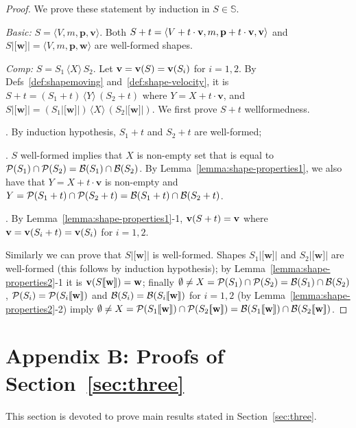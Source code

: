 \documentclass[11pt]{article}
\newcommand{\lsbrace}{\ensuremath{|\![}}
\newcommand{\rsbrace}{\ensuremath{]\!|}}
\newcommand{\shapes}{\mathbb{S}}
\newcommand{\vect}[1]{\mathbf{#1}}
\newcommand{\union}[1]{\ensuremath{\,\langle #1 \rangle\,}}
\newcommand{\bs}[4]{\ensuremath{\langle #1, #2, #3, \mathbf{#4}
\rangle}}
\newcommand{\boundary}[1]{\ensuremath{{\cal B}(#1)}}
\newcommand{\points}[1]{\ensuremath{{\cal P}(#1)}}
\newcommand{\velocity}[1]{{\bf v}(#1)}
\begin{document}
\begin{proof}
We prove these statement by induction in $S \in \shapes$.
\par\medskip\noindent
{\em Basic:} $S = \bs{V}{m}{\mathbf{p}}{v}$. Both
$S + t = \bs{V+ t \cdot {\bf v}}{m}{{\bf p}+t\cdot \mathbf{v}}{v}$ and
$S\lsbrace\vect{w}\rsbrace = \bs{V}{m}{\mathbf{p}}{w}$ are well-formed shapes.
\par\medskip\noindent
{\em Comp:} $S = S_1 \union{X} S_2$.   Let $\vect{v} = \velocity{S} = \velocity{S_i}$ for
$i=1,2$. By Defs~\ref{def:shapemoving} and~\ref{def:shape-velocity}, it is $S+ t = (S_1+t) \union{Y}
(S_2 + t)$ where $Y = X + t \cdot \vect{v}$, and $S\lsbrace\vect{w}\rsbrace =
(S_1\lsbrace\vect{w}\rsbrace) \union{X} (S_2\lsbrace\vect{w}\rsbrace)$.
We first prove $S +t$ wellformedness.

\par\medskip{}. By induction hypothesis, $S_1 + t$ and $S_2 +t$ are well-formed;

\par\medskip{}. $S$ well-formed implies that $X$ is non-empty set that is equal to
$\points{S_1} \cap \points{S_2} = \boundary{S_1} \cap \boundary{S_2}$. By
Lemma~\ref{lemma:shape-properties1}, we also
have that $Y = X + t \cdot \vect{v}$ is non-empty and $Y = \points{S_1 + t} \cap
\points{S_2 + t} = \boundary{S_1 + t} \cap \boundary{S_2 + t}$.

. By Lemma~\ref{lemma:shape-properties1}-1, $\velocity{S + t} = \vect{v}$ where
$\vect{v} = \velocity{S_i + t} = \velocity{S_i}$ for $i =1,2$.

\par\medskip\noindent Similarly we can prove that $S\lsbrace\vect{w}\rsbrace$ is well-formed. Shapes
$S_1\lsbrace\vect{w}\rsbrace$ and $S_2\lsbrace\vect{w}\rsbrace$ are well-formed (this follows by
induction hypothesis); by Lemma~\ref{lemma:shape-properties2}-1 it is
$\velocity{S\lsbrace\vect{w}\rsbrace} = \vect{w}$; finally $\emptyset \neq X = \points{S_1} \cap
\points{S_2} = \boundary{S_1} \cap \boundary{S_2}$,
$\points{S_i} = \points{S_i\lsbrace\vect{w}\rsbrace}$ and  $\boundary{S_i} = \boundary{S_i
\lsbrace\vect{w}\rsbrace}$ for $i=1,2$ (by Lemma~\ref{lemma:shape-properties2}-2) imply
$\emptyset \neq X = \points{S_1 \lsbrace\vect{w}\rsbrace } \cap \points{S_2
\lsbrace\vect{w}\rsbrace} = \boundary{S_1 \lsbrace\vect{w}\rsbrace} \cap \boundary{S_2
\lsbrace\vect{w}\rsbrace}$.
\end{proof}
\section*{Appendix B: Proofs of Section~\ref{sec:three}}
This section is devoted to prove main results stated in Section~\ref{sec:three}.
\end{document}
